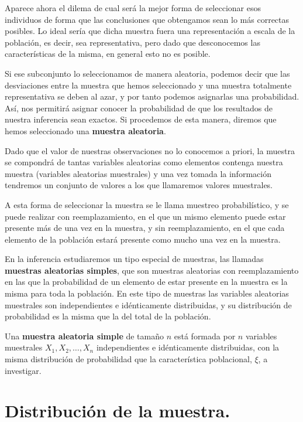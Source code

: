 Aparece ahora el dilema de cual ser\'a la mejor forma de seleccionar esos individuos de forma que las conclusiones que obtengamos sean lo m\'as correctas posibles. Lo ideal ser\'ia que dicha muestra fuera una representaci\'on a escala de la poblaci\'on, es decir, sea representativa, pero dado que desconocemos las caracter\'isticas de la misma, en general esto no es posible.

Si ese subconjunto lo seleccionamos de manera aleatoria, podemos decir que las desviaciones entre la muestra que hemos seleccionado y una muestra totalmente representativa se deben al azar, y por tanto podemos asignarlas una probabilidad. As\'i, nos permitir\'a asignar conocer la probabilidad de que los resultados de nuestra inferencia sean exactos. Si procedemos de esta manera, diremos que hemos seleccionado una \textbf{muestra aleatoria}.

Dado que el valor de nuestras observaciones no lo conocemos a priori, la muestra se compondr\'a de tantas variables aleatorias como elementos contenga nuestra muestra (variables aleatorias muestrales) y una vez tomada la informaci\'on tendremos un conjunto de valores a los que llamaremos valores muestrales.

A esta forma de seleccionar la muestra se le llama muestreo probabil\'istico, y se puede realizar con reemplazamiento, en el que un mismo elemento puede estar presente m\'as de una vez en la muestra, y sin reemplazamiento, en el que cada elemento de la poblaci\'on estar\'a presente como mucho una vez en la muestra.

En la inferencia estudiaremos un tipo especial de muestras, las llamadas \textbf{muestras aleatorias simples}, que son muestras aleatorias con reemplazamiento en las que la probabilidad de un elemento de estar presente en la muestra es la misma para toda la poblaci\'on. En este tipo de muestras las variables aleatorias muestrales son independientes e id\'enticamente distribuidas, y su distribuci\'on de probabilidad es la misma que la del total de la poblaci\'on.

\begin{definicion}
Una \textbf{muestra aleatoria simple} de tama\~no $n$ est\'a formada por $n$ variables muestrales $X_1, X_2,\ldots, X_n$ independientes e id\'enticamente distribuidas, con la misma distribuci\'on de probabilidad que la caracter\'istica poblacional, $\xi$, a investigar.
\end{definicion}

\section{Distribuci\'on de la muestra.}

